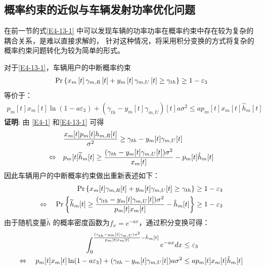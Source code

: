 \subsection{概率约束的近似与车辆发射功率优化问题}\label{section4-3-1}
在前一节的式\eqref{E4-13-1} 中可以发现车辆的功率功率在概率约束中存在较为复杂的耦合关系，是难以直接求解的，
针对这种情况，将采用积分变换的方式将复杂的概率约束问题转化为较为简单的形式。

对于\eqref{E4-13-1}，车辆用户的中断概率约束
\begin{align}
\Pr\left\{x_m\left[t\right]\gamma_{m,R}\left[t\right]+y_m\left[t\right]\gamma_{m,U}\left[t\right] \geq \gamma_{th}\right\}\geq1-\varepsilon_3    \notag
\end{align}
等价于：
\begin{equation} \label{E4-14}
\begin{gathered}
p_m\left[t\right]x_m\left[t\right]\ln \left(1-a \varepsilon_3\right)+(\gamma_{th}-y_m\left[t\right]\gamma_{m,U})\left[t\right] a \sigma^2
\leq a p_m\left[t\right]x_m\left[t\right]\hat{h}\phantom{}_{m}\left[t\right]
\end{gathered}
\end{equation}
\textbf{证明}: 由 \eqref{E4-1} 和\eqref{E4-13-1} 可得
\begin{align} \label{E4-15}
\qquad & \frac{x_m[t]p_m[t]h_{m,R}[t]}{\sigma^2} \geq \gamma_{th} - y_m[t]\gamma_{m,U}[t] \\
\Leftrightarrow \quad
& p_m[t]{\widetilde{h}}\phantom{}_{m}[t] \geq \frac{(\gamma_{th} - y_m[t]\gamma_{m,U}[t])\sigma^2}{x_m[t]} - p_m[t]{\hat{h}}\phantom{}_{m}[t] \notag
\end{align}
因此车辆用户的中断概率约束做出重新表述如下：
\begin{align} \label{E4-16}
\Pr\left\{ x_m[t]\gamma_{m,R}[t] + y_m[t]\gamma_{m,U}[t] \geq \gamma_{th} \right\} &\geq 1 - \varepsilon_3 \\
\Leftrightarrow \quad
\Pr\left\{ {\widetilde{h}}\phantom{}_{m}[t] \geq \frac{(\gamma_{th} - y_m[t]\gamma_{m,U}[t])\sigma^2}{p_m[t]x_m[t]} - {\hat{h}}\phantom{}_{m}[t] \right\} &\geq 1 - \varepsilon_3 \notag
\end{align}
由于随机变量$\widetilde{h}$ 的概率密度函数为$f_x={{e}^{-ax}}$，通过积分变换可得：
\begin{align} \label{E4-17}
\int_{0}^{\frac{(\gamma_{th}-y_m[t]\gamma_{m,U})\sigma^2}{p_m[t]x_m[t]} - \hat{h}\phantom{}_{m}[t]}{e^{-ax}dx} &\leq \varepsilon_3  \\
\Leftrightarrow \quad
p_m[t]x_m[t]\ln(1-a\varepsilon_3) + (\gamma_{th}-y_m[t]\gamma_{m,U}[t])a\sigma^2 &\leq a p_m[t]x_m[t]\hat{h}\phantom{}_{m}[t] \notag
\end{align}

